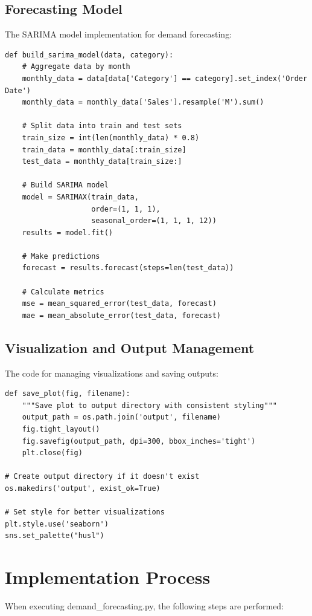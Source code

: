 \documentclass[11pt,a4paper]{article}
\begin{document}
\subsection{Forecasting Model}
The SARIMA model implementation for demand forecasting:

\begin{lstlisting}[caption=SARIMA Model Implementation]
def build_sarima_model(data, category):
    # Aggregate data by month
    monthly_data = data[data['Category'] == category].set_index('Order Date')
    monthly_data = monthly_data['Sales'].resample('M').sum()
    
    # Split data into train and test sets
    train_size = int(len(monthly_data) * 0.8)
    train_data = monthly_data[:train_size]
    test_data = monthly_data[train_size:]
    
    # Build SARIMA model
    model = SARIMAX(train_data,
                    order=(1, 1, 1),
                    seasonal_order=(1, 1, 1, 12))
    results = model.fit()
    
    # Make predictions
    forecast = results.forecast(steps=len(test_data))
    
    # Calculate metrics
    mse = mean_squared_error(test_data, forecast)
    mae = mean_absolute_error(test_data, forecast)
\end{lstlisting}

\subsection{Visualization and Output Management}
The code for managing visualizations and saving outputs:

\begin{lstlisting}[caption=Visualization and Output Management]
def save_plot(fig, filename):
    """Save plot to output directory with consistent styling"""
    output_path = os.path.join('output', filename)
    fig.tight_layout()
    fig.savefig(output_path, dpi=300, bbox_inches='tight')
    plt.close(fig)

# Create output directory if it doesn't exist
os.makedirs('output', exist_ok=True)

# Set style for better visualizations
plt.style.use('seaborn')
sns.set_palette("husl")
\end{lstlisting}

\section{Implementation Process}
When executing demand\_forecasting.py, the following steps are performed:
\end{document}
